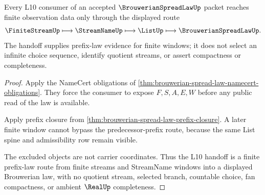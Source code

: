 \begin{theorem}
\label{thm:brouwerian-spread-law-finite-window-handoff}
Every L10 consumer of an accepted $\BrouwerianSpreadLawUp$ packet reaches finite observation data only through the displayed route
$$
\FiniteStreamUp \longmapsto \StreamNameUp \longmapsto \ListUp \longmapsto \BrouwerianSpreadLawUp .
$$
The handoff supplies prefix-law evidence for finite windows; it does not select an infinite choice sequence, identify quotient streams, or assert compactness or completeness.
\end{theorem}
\begin{proof}
Apply the NameCert obligations of \autoref{thm:brouwerian-spread-law-namecert-obligations}. They force the consumer to expose $F,S,A,E,W$ before any public read of the law is available.

Apply prefix closure from \autoref{thm:brouwerian-spread-law-prefix-closure}. A later finite window cannot bypass the predecessor-prefix route, because the same List spine and admissibility row remain visible.

The excluded objects are not carrier coordinates. Thus the L10 handoff is a finite prefix-law route from finite streams and StreamName windows into a displayed Brouwerian law, with no quotient stream, selected branch, countable choice, fan compactness, or ambient $\RealUp$ completeness.
\end{proof}


\begin{closurestatus}{\BrouwerianSpreadLawUp}
  \theoryclosure{\seedClosure}
  \formalstatus{\unformalizedV}
\end{closurestatus}

